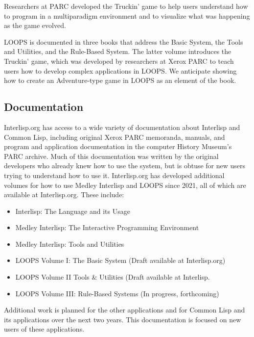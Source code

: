 \documentclass[sigconf]{acmart}
\begin{document}
Researchers at PARC developed the Truckin' game to help users understand how to program in a multiparadigm environment and to visualize what was happening as the game evolved\cite{Stefik83}.

LOOPS is documented in three books that address the Basic System, the Tools and Utilities, and the Rule-Based System. The latter volume introduces the Truckin' game\cite{Stefik00}, which was developed by researchers at Xerox PARC to teach users how to develop complex applications in LOOPS. We anticipate showing how to create an Adventure-type game in LOOPS as an element of the book.


\subsection{Documentation}

Interlisp.org has access to a wide variety of documentation about Interlisp and Common Lisp, including original Xerox PARC memoranda, manuals, and program and application documentation in the computer History Museum's PARC archive. Much of this documentation was written by the original developers who already knew how to use the system, but is obtuse for new users trying to understand how to use it. Interlisp.org has developed additional volumes for how to use Medley Interlisp and LOOPS since 2021, all of which are available at Interlisp.org. These include:

\begin{itemize}
    \item Interlisp: The Language and its Usage
    \item Medley Interlisp: The Interactive Programming Environment
    \item Medley Interlisp: Tools and Utilities
    \item LOOPS Volume I: The Basic System (Draft available at Interlisp.org)
    \item LOOPS Volume II Tools \& Utilities (Draft available at Interlisp.
    \item LOOPS Volume III: Rule-Based Systems (In progress, forthcoming)
\end{itemize}
    
Additional work is planned for the other applications and for Common Lisp and its applications over the next two years. This documentation is focused on new users of these applications. 
\end{document}
